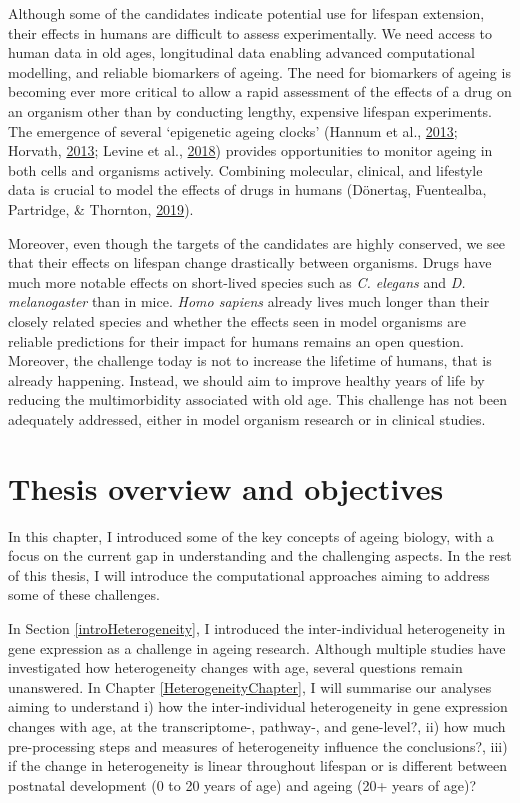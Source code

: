 \documentclass[12pt,twoside]{unicam}
\begin{document}
Although some of the candidates indicate potential use for lifespan extension, their effects in humans are difficult to assess experimentally. We need access to human data in old ages, longitudinal data enabling advanced computational modelling, and reliable biomarkers of ageing. The need for biomarkers of ageing is becoming ever more critical to allow a rapid assessment of the effects of a drug on an organism other than by conducting lengthy, expensive lifespan experiments. The emergence of several `epigenetic ageing clocks' (Hannum et al., \protect\hyperlink{ref-Hannum2013}{2013}; Horvath, \protect\hyperlink{ref-Horvath2013}{2013}; Levine et al., \protect\hyperlink{ref-Levine2018}{2018}) provides opportunities to monitor ageing in both cells and organisms actively. Combining molecular, clinical, and lifestyle data is crucial to model the effects of drugs in humans (Dönertaş, Fuentealba, Partridge, \& Thornton, \protect\hyperlink{ref-Donertas2019}{2019}).

Moreover, even though the targets of the candidates are highly conserved, we see that their effects on lifespan change drastically between organisms. Drugs have much more notable effects on short-lived species such as \emph{C. elegans} and \emph{D. melanogaster} than in mice. \emph{Homo sapiens} already lives much longer than their closely related species and whether the effects seen in model organisms are reliable predictions for their impact for humans remains an open question. Moreover, the challenge today is not to increase the lifetime of humans, that is already happening. Instead, we should aim to improve healthy years of life by reducing the multimorbidity associated with old age. This challenge has not been adequately addressed, either in model organism research or in clinical studies.

\hypertarget{thesis-overview-and-objectives}{%
\section{Thesis overview and objectives}\label{thesis-overview-and-objectives}}

In this chapter, I introduced some of the key concepts of ageing biology, with a focus on the current gap in understanding and the challenging aspects. In the rest of this thesis, I will introduce the computational approaches aiming to address some of these challenges.

In Section \ref{introHeterogeneity}, I introduced the inter-individual heterogeneity in gene expression as a challenge in ageing research. Although multiple studies have investigated how heterogeneity changes with age, several questions remain unanswered. In Chapter \ref{HeterogeneityChapter}, I will summarise our analyses aiming to understand i) how the inter-individual heterogeneity in gene expression changes with age, at the transcriptome-, pathway-, and gene-level?, ii) how much pre-processing steps and measures of heterogeneity influence the conclusions?, iii) if the change in heterogeneity is linear throughout lifespan or is different between postnatal development (0 to 20 years of age) and ageing (20+ years of age)?
\end{document}

